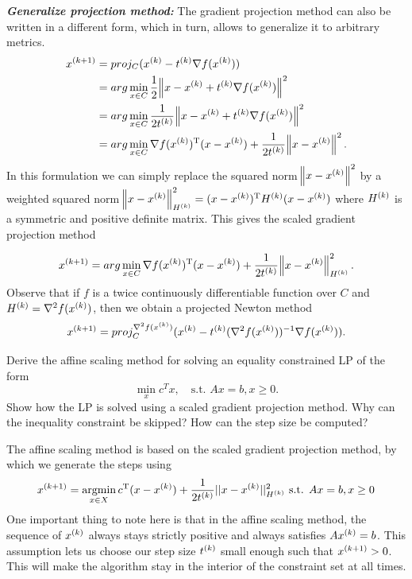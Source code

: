 \documentclass[12pt,a4paper]{article}
\begin{document}
	\textbf{\textit{Generalize projection method:}} The gradient projection method can also be written in a different form, which in turn, allows to generalize it to arbitrary metrics.
	\begin{align*}
    \kth[k+1]{x} &= proj_C(\kth{x} - \kth{t} \nabla f(\kth{x}))
    \\ &= arg \min_{x\in C} \frac{1}{2} \norm{x - \kth{x} + \kth{t}\nabla f(\kth{x})}^2
    \\ &= arg \min_{x\in C} \frac{1}{2\kth{t}}\norm{x -\kth{x}+ \kth{t}\nabla f(\kth{x})}^2
    \\ &= arg \min_{x\in C} \nabla \T{f(\kth{x})} (x - \kth{x}) + \frac{1}{2\kth{t}} \norm{x -\kth{x}}^2.
	\end{align*}
In this formulation we can simply replace the squared norm $\norm{x-\kth{x}}^2$ by a weighted squared norm $\norm{x-\kth{x}}^2_{\kth{H}} = \T{(x-\kth{x})} \kth{H}(x-\kth{x})$ where $\kth{H}$ is a symmetric and positive definite matrix. This gives the scaled gradient projection method

\begin{equation*}
    \kth[k+1]{x} = arg \min_{x\in C} \nabla \T{f(\kth{x})} (x -\kth{x}) + \frac{1}{2\kth{t}}\norm{x-\kth{x}}^{2}_{\kth{H}}.
\end{equation*}
Observe that if $f$ is a twice continuously differentiable function over $C$ and $\kth{H} = \nabla^2 f(\kth{x}) $, then we obtain a projected Newton method
\begin{equation*}
    \kth[k+1]{x} = proj^{\nabla^2 f(\kth{x})}_C (\kth{x} - \kth{t}(\nabla^2 f (\kth{x}))^{-1} \nabla f(\kth{x})).
\end{equation*}



\begin{question}
  Derive the affine scaling method for solving an equality constrained LP of the form 
  \begin{equation*}
  \min_x c^T x, \quad\text{s.t. } Ax = b, x \geq 0.
    \end{equation*}
  Show how the LP is solved using a scaled gradient projection method. Why can the inequality constraint be skipped? How can the step size be computed?
\end{question}

The affine scaling method is based on the scaled gradient projection method, by which we generate
the steps using
\begin{equation*}
  \kth[k+1]{x} = \argmin_{x \in X} \T{c} (x - \kth{x}) + \frac{1}{2\kth{t}} ||x - \kth{x}||^{2}_{\kth{H}} \text{ s.t. } Ax=b, x \geq 0
\end{equation*}
One important thing to note here is that in the affine scaling method, the sequence of $\kth{x}$ always stays strictly positive and always satisfies $A\kth{x}=b$.
This assumption lets us choose our step size $\kth{t}$ small enough such that $\kth[k+1]{x} > 0$. This will make the algorithm stay in the interior of the constraint set at all times.
\end{document}
